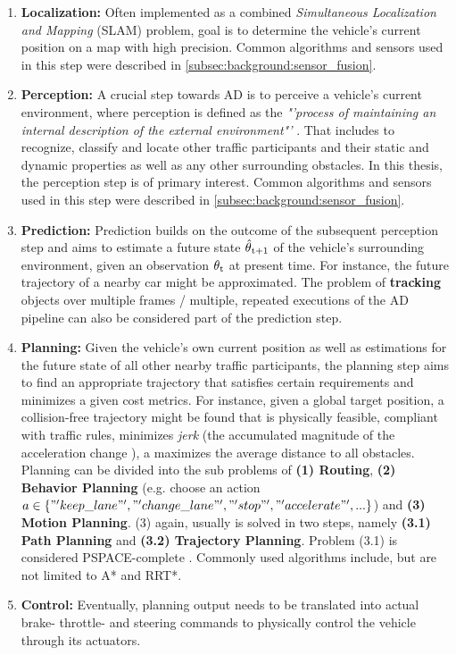 \begin{enumerate}
	\item \textbf{Localization:} Often implemented as a combined \textit{Simultaneous Localization and Mapping} (SLAM) problem, goal is to determine the vehicle's current position on a map with high precision. Common algorithms and sensors used in this step were described in \ref{subsec:background:sensor_fusion}.
	\item \textbf{Perception:} A crucial step towards AD is to perceive a vehicle's current environment, where perception is defined as the \textit{"'process of maintaining an internal description of the external environment"'} \cite{Crowley1993}. That includes to recognize, classify and locate other traffic participants and their static and dynamic properties as well as any other surrounding obstacles. In this thesis, the perception step is of primary interest. Common algorithms and sensors used in this step were described in \ref{subsec:background:sensor_fusion}.
	\item \textbf{Prediction:} Prediction builds on the outcome of the subsequent perception step and aims to estimate a future state $\hat{\theta}\textsubscript{t+1}$ of the vehicle's surrounding environment, given an observation $\theta\textsubscript{t}$ at present time. For instance, the future trajectory of a nearby car might be approximated. The problem of \textbf{tracking} objects over multiple frames / multiple, repeated executions of the AD pipeline can also be considered part of the prediction step. 
	\item \textbf{Planning:} Given the vehicle's own current position as well as estimations for the future state of all other nearby traffic participants, the planning step aims to find an appropriate trajectory that satisfies certain requirements and minimizes a given cost metrics. For instance, given a global target position, a collision-free trajectory might be found that is physically feasible, compliant with traffic rules, minimizes \textit{jerk} (the accumulated magnitude of the acceleration change \cite{paden2016survey}), a maximizes the average distance to all obstacles. Planning can be divided into the sub problems of \textbf{(1) Routing}, \textbf{(2) Behavior Planning} (e.g. choose an action $a \in \{ "'keep\_lane"', "'change\_lane"', "'stop"', "'accelerate"', ... \}$) and \textbf{(3) Motion Planning}. (3) again, usually is solved in two steps, namely \textbf{(3.1) Path Planning} and \textbf{(3.2) Trajectory Planning}. Problem (3.1) is considered PSPACE-complete \cite{paden2016survey}. Commonly used algorithms include, but are not limited to A* and RRT*.
	\item \textbf{Control:} Eventually, planning output needs to be translated into actual brake- throttle- and steering commands to physically control the vehicle through its actuators. 
\end{enumerate}

